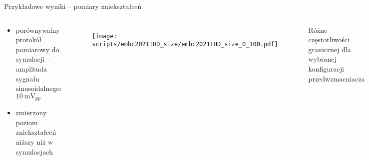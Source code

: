 
\begin{frame}{Przykładowe wyniki -- pomiary zniekształceń}


    \begin{columns}

\vspace{-1em}
        \begin{block}{}
            \begin{itemize}
                \item porównywalny protokół pomiarowy do symulacji -- amplituda sygnału sinusoidalnego: $\SI{10}{\milli\volt_{pp}}$
                \item zmierzony poziom zniekształceń niższy niż w symulacjach
            \end{itemize}
        \end{block}
        \vspace{-1em}

            \begin{figure}[H]
                \centering
                \texttt{[image: scripts/embc2021THD\_size/embc2021THD\_size\_0\_100.pdf]}
            \end{figure}   

            
        Różne częstotliwości granicznej dla wybranej konfiguracji przedwzmacniacza
        \begin{figure}[H]
            \centering
            \texttt{[image: scripts/embc2021THD\_fc/embc2021THD\_fc.pdf]}
        \end{figure}

\end{columns}

\end{frame}


  

